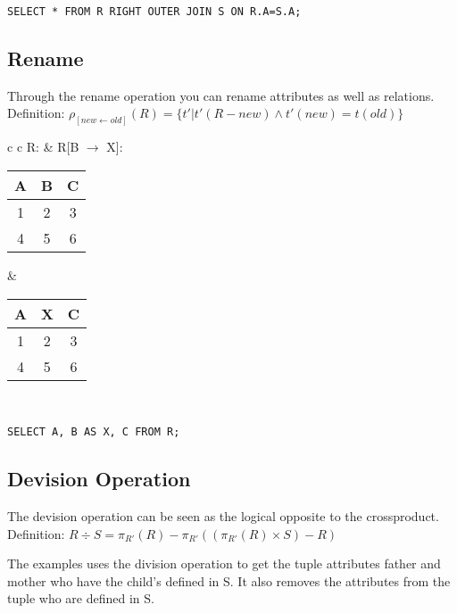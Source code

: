 \lstset{language=SQL,tabsize=4,captionpos=b,frame=single,
basicstyle=\footnotesize}
\begin{lstlisting}[caption=Right-Outer-Join]
SELECT * FROM R RIGHT OUTER JOIN S ON R.A=S.A;
\end{lstlisting}

\subsection{Rename}
Through the rename operation you can rename attributes as well as relations.\\
Definition: $\rho_{[new \leftarrow old]}(R) = \{t' | t' (R - new) \land t'(new)
= t(old)\}$\\

\begin{tabular}{ c c}
	R: & R[B $\rightarrow$ X]:\\
	\begin{tabular}{|c|c|c|}
		\hline
		A & B & C\\
		\hline
		1 & 2 & 3\\
		\hline
		4 & 5 & 6\\
		\hline
	\end{tabular} &

	\begin{tabular}{|c|c|c|}
		\hline
		A & X & C\\
		\hline
		1 & 2 & 3\\
		\hline
		4 & 5 & 6\\
		\hline
	\end{tabular}
\end{tabular}\\

\lstset{language=SQL,tabsize=4,captionpos=b,frame=single,
basicstyle=\footnotesize}
\begin{lstlisting}[caption=Right-Outer-Join]
SELECT A, B AS X, C FROM R;
\end{lstlisting}

\subsection{Devision Operation}
The devision operation can be seen as the logical opposite to the
crossproduct.\\
Definition: $R \div S = \pi_{R'}(R) - \pi_{R'}((\pi_{R'}(R) \times S) - R)$

The examples uses the division operation to get the tuple attributes father and
mother who have the child's defined in S. It also removes the attributes from
the tuple who are defined in S.\\

